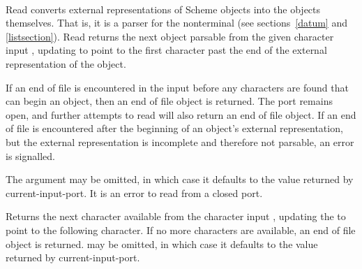 \noindent \hbox{ }  %
\vspace{-5ex}

\begin{entry}{%
}

{\cf Read} converts external representations of Scheme objects into the
objects themselves.  That is, it is a parser for the nonterminal
 (see sections~\ref{datum} and
\ref{listsection}).  {\cf Read} returns the next
object parsable from the given character input , updating
 to point to
the first character past the end of the external representation of the object.

\vest If an end of file is encountered in the input before any
characters are found that can begin an object, then an end of file
object is returned.  \todo{} The port remains open, and further attempts
to read will also return an end of file object.  If an end of file is
encountered after the beginning of an object's external representation,
but the external representation is incomplete and therefore not parsable,
an error is signalled.

The  argument may be omitted, in which case it defaults to the
value returned by {\cf current-input-port}.  It is an error to read from
a closed port.
\end{entry}

\begin{entry}{%
}

Returns the next character available from the character input ,
updating
the  to point to the following character.  If no more characters
are available, an end of file object is returned.   may be
omitted, in which case it defaults to the value returned by {\cf current-input-port}.

\end{entry}


